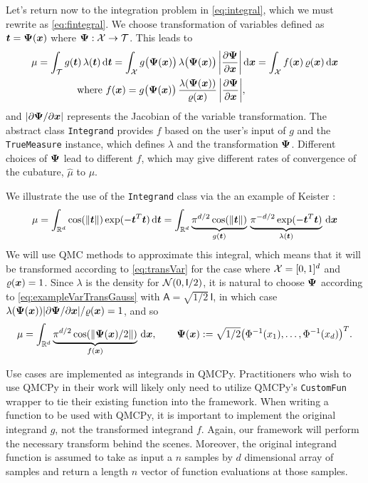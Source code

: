 \documentclass[graybox,footinfo]{svmult}
\newcommand{\QMCPYabs}[1]{\ensuremath{{\left \lvert #1 \right \rvert}}}
\newcommand{\hmu}{\widehat{\mu}}
\newcommand{\mA}{\mathsf{A}}
\newcommand{\mI}{\mathsf{I}}
\begin{document}
Let's return now to the integration problem in \eqref{eq:integral}, which we must rewrite as \eqref{eq:fintegral}.  We choose transformation of variables defined as ${\boldsymbol{t}} = {\boldsymbol{\Psi}}({\boldsymbol{x}})$ where ${\boldsymbol{\Psi}}:{\mathcal{X}} \to {\mathcal{T}}$.  This leads to 
\begin{align}
	\nonumber 
 \mu &= \int_\calT g(\bst) \, \lambda(\bst) \, \D \bst  = \int_\calX g\bigl(\bsPsi(\bsx)\bigr) \, \lambda\bigl(\bsPsi(\bsx)\bigr) \,\QMCPYabs{\frac{\partial \bsPsi}{\partial \bsx}} \, \D \bsx =  \int_\calX f(\bsx) \, \varrho(\bsx) \, \D \bsx  \\
 \label{eq:transVar}
  & \qquad \qquad \text{where } f(\bsx)  = g\bigl(\bsPsi(\bsx)\bigr)  \, \frac{\lambda(\bsPsi(\bsx))}{\varrho(\bsx)} \,\QMCPYabs{\frac{\partial \bsPsi}{\partial \bsx}},
\end{align}
and $\QMCPYabs{\partial \bsPsi/\partial \bsx}$ represents the Jacobian of the variable transformation.  The abstract class \texttt{Integrand} provides $f$ based on the user's input of $g$ and the \texttt{TrueMeasure} instance, which defines $\lambda$ and the transformation ${\boldsymbol{\Psi}}$.  Different choices of ${\boldsymbol{\Psi}}$ lead to different $f$, which may give different rates of convergence of the cubature, $\hmu$ to $\mu$.  

We illustrate the use of the \texttt{Integrand} class via the an example of Keister \cite{Kei96}:
\begin{equation*}
	\mu 
	= \int_{\mathbb{R}^d} \cos(\lVert {\boldsymbol{t}} \rVert) \exp(-{\boldsymbol{t}}^T {\boldsymbol{t}}) \, \mathrm{d} {\boldsymbol{t}} \\ 
	= \int_{\mathbb{R}^d} \underbrace{\pi^{d/2} \cos(\lVert {\boldsymbol{t}} \rVert)}_{g({\boldsymbol{t}})}\, \underbrace{\pi^{-d/2} \exp(-{\boldsymbol{t}}^T {\boldsymbol{t}}) }_{\lambda({\boldsymbol{t}})} \, \mathrm{d} {\boldsymbol{x}}
\end{equation*}
We will use QMC methods to approximate this integral, which means that it will be transformed according to \eqref{eq:transVar} for the case where ${\mathcal{X}} = [0,1]^d$ and $\varrho({\boldsymbol{x}}) = 1$.  Since $\lambda$ is the density for $\calN(0,\mI/2)$, it is natural to choose ${\boldsymbol{\Psi}}$ according to \eqref{eq:exampleVarTransGauss} with $\mA = \sqrt{1/2} \, \mI$, in which case $\lambda(\bsPsi(\bsx)) \QMCPYabs{\partial \bsPsi/\partial \bsx} / \varrho(\bsx) = 1$, and so 
\[
\mu = \int_{\mathbb{R}^d} \underbrace{\pi^{d/2} \cos(\lVert {\boldsymbol{\Psi}}({\boldsymbol{x}})/2 \rVert)}_{f({\boldsymbol{x}})} \, \mathrm{d} {\boldsymbol{x}}, \qquad 
{\boldsymbol{\Psi}}({\boldsymbol{x}}) := \sqrt{1/2}\bigl(\Phi^{-1}(x_1),  \ldots, \Phi^{-1}(x_d)\bigr)^T .
\]



Use cases are implemented as integrands in QMCPy. Practitioners who wish to use QMCPy in their work will likely only need to utilize QMCPy's \texttt{CustomFun} wrapper to tie their existing function into the framework. When writing a function to be used with QMCPy, it is important to implement the original integrand $g$, not the transformed integrand $f$. Again, our framework will perform the necessary transform behind the scenes. Moreover, the original integrand function is assumed to take as input a $n$ samples by $d$ dimensional array of samples and return a length $n$ vector of function evaluations at those samples. 
\end{document}
